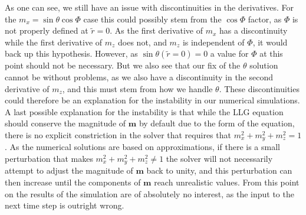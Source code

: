 As one can see, we still have an issue with discontinuities in the derivatives. For the $m_x = \sin\theta\cos\Phi$ case this could possibly stem from the $\cos\Phi$ factor, as $\Phi$ is not properly defined at $\tilde{r}=0$. As the first derivative of $m_x$ has a discontinuity while the first derivative of $m_z$ does not, and $m_z$ is independent of $\Phi$, it would back up this hypothesis. However, as $\sin\theta(\tilde{r}=0)=0$ a value for $\Phi$ at this point should not be necessary. But we also see that our fix of the $\theta$ solution cannot be without problems, as we also have a discontinuity in the second derivative of $m_z$, and this must stem from how we handle $\theta$. These discontinuities could therefore be an explanation for the instability in our numerical simulations. A last possible explanation for the instability is that while the LLG equation should conserve the magnitude of $\mathbold{m}$ by default due to the form of the equation, there is no explicit constriction in the solver that requires that $m_x^2+m_y^2+m_z^2=1$. As the numerical solutions are based on approximations, if there is a small perturbation that makes $m_x^2+m_y^2+m_z^2\neq1$ the solver will not necessarily attempt to adjust the magnitude of $\mathbold{m}$ back to unity, and this perturbation can then increase until the components of $\mathbold{m}$ reach unrealistic values. From this point on the results of the simulation are of absolutely no interest, as the input to the next time step is outright wrong.

